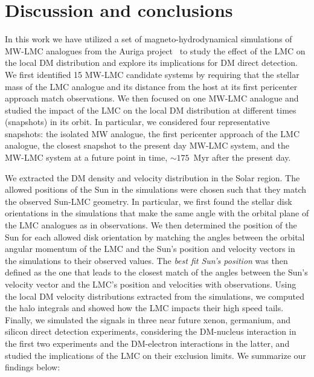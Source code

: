 \section{Discussion and conclusions}
\label{sec: discussion}

In this work we have utilized a set of magneto-hydrodynamical simulations of MW-LMC analogues from the Auriga project~\cite{Grand:2016mgo} to study the effect of the LMC on the local DM  distribution and explore its implications for DM direct detection. We first identified  15 MW-LMC candidate systems by requiring that the stellar mass of the LMC analogue and its distance from the host at its first pericenter approach match observations. We then focused on one MW-LMC analogue and studied the impact of the LMC on the local DM distribution at different times (snapshots) in its orbit. In particular, we considered four representative snapshots: the isolated MW analogue, the first pericenter approach of the LMC analogue, the closest snapshot to the present day MW-LMC system, and the MW-LMC system at a future point in time, $\sim 175$~Myr after the present day. 



We extracted the DM density and velocity distribution in the Solar region. 
The allowed positions of the Sun in the simulations were chosen such that they match the observed Sun-LMC geometry. In particular, we first found the stellar disk orientations in the simulations that make the same angle with the orbital plane of the LMC analogues as in observations. We then determined the position of the Sun for each allowed disk orientation by matching the angles between the orbital angular momentum of the LMC and the Sun's position and velocity vectors in the simulations to their observed values. The \emph{best fit Sun's position} was then defined as the one that leads to the closest match of the angles between the Sun's velocity vector and the LMC's position and velocities with observations. Using the local DM velocity distributions extracted from the simulations, we computed the halo integrals and showed how the LMC impacts their high speed tails. Finally, we simulated the signals in three near future xenon, germanium, and silicon direct detection experiments, considering the DM-nucleus interaction in the first two experiments and the DM-electron interactions in the latter, and studied the implications of the LMC on their exclusion limits. We summarize our findings below:

